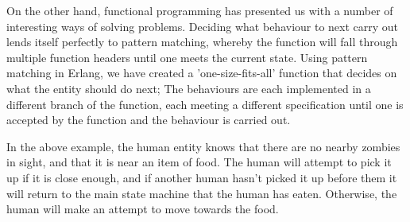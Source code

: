 On the other hand, functional programming has presented us with a number of interesting ways of solving problems. Deciding what behaviour to next carry out lends itself perfectly to pattern matching, whereby the function will fall through multiple function headers until one meets the current state. Using pattern matching in Erlang, we have created a 'one-size-fits-all' function that decides on what the entity should do next; The behaviours are each implemented in a different branch of the function, each meeting a different specification until one is accepted by the function and the behaviour is carried out.

In the above example, the human entity knows that there are no nearby zombies in sight, and that it is near an item of food. The human will attempt to pick it up if it is close enough, and if another human hasn't picked it up before them it will return to the main state machine that the human has eaten. Otherwise, the human will make an attempt to move towards the food.

\clearpage
\endinput
